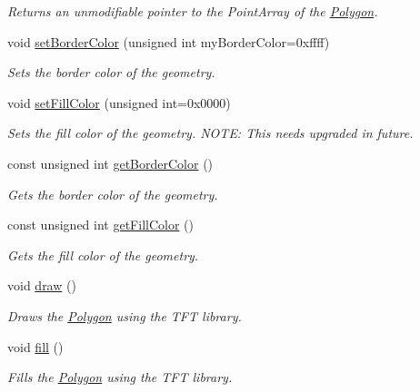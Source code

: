 \begin{DoxyCompactItemize}
\begin{DoxyCompactList}\small\item\em Returns an unmodifiable pointer to the Point\+Array of the \hyperlink{class_polygon}{Polygon}. \end{DoxyCompactList}\item 
void \hyperlink{class_polygon_a91e2048df838eefbf1b291cff13fa540}{set\+Border\+Color} (unsigned int my\+Border\+Color=0xffff)
\begin{DoxyCompactList}\small\item\em Sets the border color of the geometry. \end{DoxyCompactList}\item 
void \hyperlink{class_polygon_ad7caa8108c50e0caf41f286660bbf011}{set\+Fill\+Color} (unsigned int=0x0000)
\begin{DoxyCompactList}\small\item\em Sets the fill color of the geometry. N\+O\+T\+E\+: This needs upgraded in future. \end{DoxyCompactList}\item 
const unsigned int \hyperlink{class_polygon_a89f6cf0b0bc01911b959ada782f9dfd8}{get\+Border\+Color} ()
\begin{DoxyCompactList}\small\item\em Gets the border color of the geometry. \end{DoxyCompactList}\item 
const unsigned int \hyperlink{class_polygon_a1213dc7e01a5c9fc66f0b7190c8b02b6}{get\+Fill\+Color} ()
\begin{DoxyCompactList}\small\item\em Gets the fill color of the geometry. \end{DoxyCompactList}\item 
\hypertarget{class_polygon_a17428a7d7dff4653c905b91020a9f803}{void \hyperlink{class_polygon_a17428a7d7dff4653c905b91020a9f803}{draw} ()}\label{class_polygon_a17428a7d7dff4653c905b91020a9f803}

\begin{DoxyCompactList}\small\item\em Draws the \hyperlink{class_polygon}{Polygon} using the T\+F\+T library. \end{DoxyCompactList}\item 
\hypertarget{class_polygon_aaa6f282cafd882068fae7018741aabaf}{void \hyperlink{class_polygon_aaa6f282cafd882068fae7018741aabaf}{fill} ()}\label{class_polygon_aaa6f282cafd882068fae7018741aabaf}

\begin{DoxyCompactList}\small\item\em Fills the \hyperlink{class_polygon}{Polygon} using the T\+F\+T library. \end{DoxyCompactList}\end{DoxyCompactItemize}

